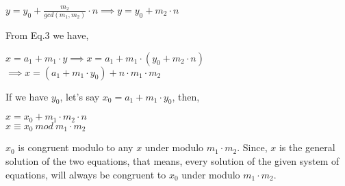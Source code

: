 \documentclass[11pt]{article}
\begin{document}
\begin{center}
    $y = y_0 + \frac{m_2}{gcd(m_1, m_2)} \cdot n \implies y = y_0 + m_2 \cdot n$
\end{center}
From Eq.3 we have, 
\begin{center}
    $x = a_1 + m_1 \cdot y \implies x = a_1 + m_1 \cdot (y_0 + m_2 \cdot n)$\\
    \vspace{1mm}
    $\implies x = (a_1 + m_1 \cdot y_0) + n \cdot m_1 \cdot m_2$
\end{center}
If we have $y_0$, let's say $x_0 = a_1 + m_1 \cdot y_0$, then,
\begin{center}
    $x = x_0 + m_1 \cdot m_2 \cdot n$\\
    \vspace{1mm}
    $x \equiv x_0 \ mod \ m_1 \cdot m_2$
\end{center}
$x_0$ is congruent modulo to any $x$ under modulo $m_1 \cdot m_2$. Since, $x$ is the general solution of the two equations, that means, every solution of the given system of equations, will always be congruent to $x_0$ under modulo $m_1 \cdot m_2$.
\end{document}
